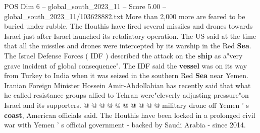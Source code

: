 \begin{textsample}{POS Dim 6 – global\_south\_2023\_11 – Score 5.00 – global\_south\_2023\_11/103628882.txt}
More than 2,000 more are feared to be buried under rubble.
The Houthis have fired several missiles and drones towards Israel just after Israel launched its retaliatory operation.
The US said at the time that all the missiles and drones were intercepted by its warship in the Red \textbf{Sea}.
The Israel Defense Forces ( IDF ) described the attack on the \textbf{ship} as a"very grave incident of global consequence".
The IDF said the \textbf{vessel} was on its way from Turkey to India when it was seized in the southern Red \textbf{Sea} near Yemen.
Iranian Foreign Minister Hossein Amir-Abdollahian has recently said that what he called resistance groups allied to Tehran were"cleverly adjusting pressure"on Israel and its supporters. @ @ @ @ @ @ @ @ @ @ military drone off Yemen ' s \textbf{coast}, American officials said.
The Houthis have been locked in a prolonged civil war with Yemen ' s official government - backed by Saudi Arabia - since 2014.

\end{textsample}
